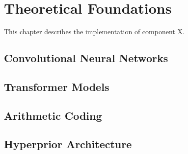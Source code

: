 \chapter{Theoretical Foundations\label{cha:chapter3}}

This chapter describes the implementation of component X.

\section{Convolutional Neural Networks}

\section{Transformer Models}

\section{Arithmetic Coding}

\section{Hyperprior Architecture}